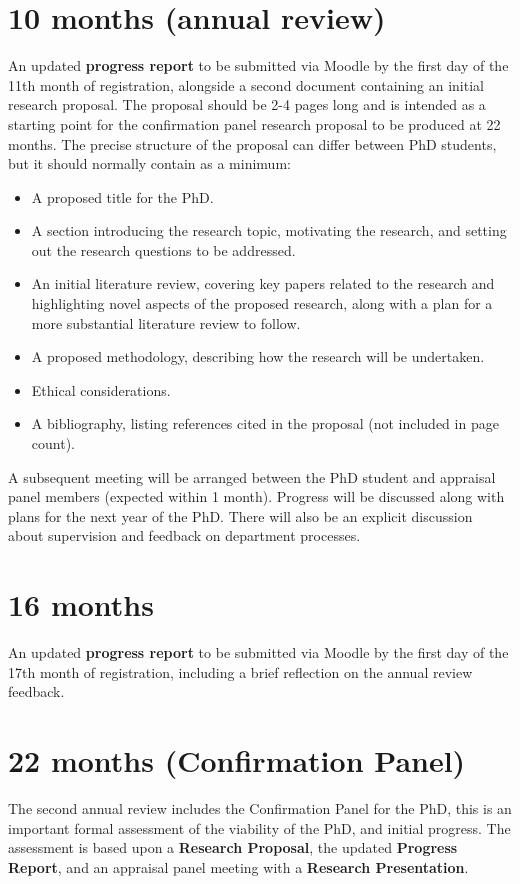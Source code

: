 \documentclass[12pt,a4paper]{article}
\begin{document}
\section{10 months (annual review)}
An updated \textbf{progress report} to be submitted via Moodle by the first day of the 11th month of registration, alongside a second document containing an initial research proposal. The proposal should be 2-4 pages long and is intended as a starting point for the confirmation panel research proposal to be produced at 22 months. The precise structure of the proposal can differ between PhD students, but it should normally contain as a minimum:
\begin{itemize}
	\item A proposed title for the PhD.
	\item A section introducing the research topic, motivating the research, and setting out the research questions to be addressed.
	\item An initial literature review, covering key papers related to the research and highlighting novel aspects of the proposed research, along with a plan for a more substantial literature review to follow.
	\item A proposed methodology, describing how the research will be undertaken.
	\item Ethical considerations.
	\item A bibliography, listing references cited in the proposal (not included in page count).
\end{itemize}

A subsequent meeting will be arranged between the PhD student and appraisal panel members (expected within 1 month). Progress will be discussed along with plans for the next year of the PhD. There will also be an explicit discussion about supervision and feedback on department processes.

\section{16 months}
An updated \textbf{progress report} to be submitted via Moodle by the first day of the 17th month of registration, including a brief reflection on the annual review feedback.

\section{22 months (Confirmation Panel)}
The second annual review includes the Confirmation Panel for the PhD, this is an important formal assessment of the viability of the PhD, and initial progress. The assessment is based upon a \textbf{Research Proposal}, the updated \textbf{Progress Report}, and an appraisal panel meeting with a \textbf{Research Presentation}.
\end{document}
